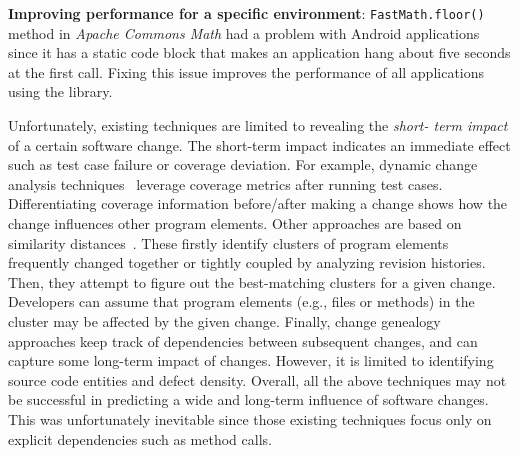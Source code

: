 {\bf Improving performance for a specific environment}:
\texttt{FastMath.floor()} method in \emph{Apache Commons Math} had a problem
with Android applications since it has a static code block that makes an
application hang about five seconds at the first call. Fixing this issue
improves the performance of all applications using the library. 



\vspace{0.15in}
Unfortunately, existing techniques are limited to revealing the \emph{short-
term impact} of a certain software change. The short-term impact indicates an
immediate effect such as test case failure or coverage deviation. For example,
dynamic change analysis
techniques~\cite{ren_chianti:_2004,zhang_faulttracer:_2012} leverage coverage
metrics after running test cases. Differentiating coverage information
before/after making a change shows how the change influences other program
elements. Other approaches are based on similarity distances~\cite{robillard_retrieving_2008,sherriff_empirical_2008}.
 These
firstly identify clusters of program elements frequently changed
together or tightly coupled by analyzing revision histories. Then, they
attempt to figure out the best-matching clusters for a given change.
Developers can assume that program elements (e.g., files or methods) in the
cluster may be affected by the given change. Finally, change genealogy~\cite{herzig_capturing_2010,herzig_mining_2011,herzig_predicting_2013} 
approaches keep track of dependencies between subsequent changes, and can capture some long-term impact of changes.
However, it is limited to identifying source code entities and defect density. Overall, all  the above
techniques may not be successful in predicting a wide and long-term influence
of software changes. This was unfortunately inevitable since those existing
techniques focus only on explicit dependencies such as method calls.

